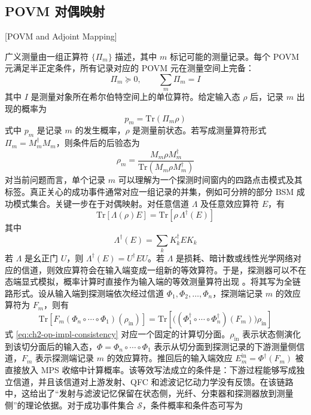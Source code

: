 \subsection{POVM 对偶映射}[POVM and Adjoint Mapping]

广义测量由一组正算符 $\{\Pi_m\}$ 描述，其中 $m$ 标记可能的测量记录。每个 POVM 元满足半正定条件，所有记录对应的 POVM 元在测量空间上完备：
\begin{equation}
\Pi_m \succeq 0,\qquad \sum_m \Pi_m = I
\label{eq:ch2-povm-complete}
\end{equation}
其中 $I$ 是测量对象所在希尔伯特空间上的单位算符。给定输入态 $\rho$ 后，记录 $m$ 出现的概率为
\begin{equation}
p_m=\mathrm{Tr}(\Pi_m\rho)
\label{eq:ch2-povm-prob}
\end{equation}
式中 $p_m$ 是记录 $m$ 的发生概率，$\rho$ 是测量前状态。若写成测量算符形式 $\Pi_m=M_m^{\dagger}M_m$，则条件后的后验态为
\begin{equation}
\rho_m=\frac{M_m\rho M_m^{\dagger}}{\mathrm{Tr}(M_m\rho M_m^{\dagger})}
\label{eq:ch2-posterior-single}
\end{equation}
对当前问题而言，单个记录 $m$ 可以理解为一个探测时间窗内的四路点击模式及其标签。真正关心的成功事件通常对应一组记录的并集，例如可分辨的部分 BSM 成功模式集合。关键一步在于对偶映射。对任意信道 $\Lambda$ 及任意效应算符 $E$，有
\begin{equation}
\mathrm{Tr}[\Lambda(\rho)E]
=
\mathrm{Tr}[\rho\,\Lambda^{\dagger}(E)]
\label{eq:ch2-adjoint}
\end{equation}
其中
\begin{equation}
\Lambda^{\dagger}(E)=\sum_k K_k^{\dagger}EK_k
\label{eq:ch2-adjoint-kraus}
\end{equation}
若 $\Lambda$ 是幺正门 $U$，则 $\Lambda^{\dagger}(E)=U^{\dagger}EU$。若 $\Lambda$ 是损耗、暗计数或线性光学网络对应的信道，则效应算符会在输入端变成一组新的等效算符。于是，探测器可以不在态端显式模拟，概率计算时直接作为输入端的等效测量算符出现 \cite{Kraus1983StatesEffectsOperations,NielsenChuang2010QCQI}。将其写为全链路形式。设从输入端到探测端依次经过信道 $\Phi_1,\Phi_2,\ldots,\Phi_n$，探测端记录 $m$ 的效应算符为 $F_m$，则有
\begin{equation}
\mathrm{Tr}\!\left[F_m(\Phi_n\circ\cdots\circ\Phi_1)(\rho_{\mathrm{in}})\right]
=
\mathrm{Tr}\!\left[\bigl((\Phi_1^{\dagger}\circ\cdots\circ\Phi_n^{\dagger})(F_m)\bigr)\rho_{\mathrm{in}}\right]
\label{eq:ch2-op-impl-consistency}
\end{equation}
式 \eqref{eq:ch2-op-impl-consistency} 对应一个固定的计算切分面。$\rho_{\mathrm{in}}$ 表示状态侧演化到该切分面后的输入态，$\Phi=\Phi_n\circ\cdots\circ\Phi_1$ 表示从切分面到探测记录的下游测量侧信道，$F_m$ 表示探测端记录 $m$ 的效应算符。推回后的输入端效应 $E_m^{\mathrm{in}}=\Phi^{\dagger}(F_m)$ 被直接放入 MPS 收缩中计算概率。该等效写法成立的条件是：下游过程能够写成独立信道，并且该信道对上游发射、QFC 和滤波记忆动力学没有反馈。在该链路中，这给出了“发射与滤波记忆保留在状态侧，光纤、分束器和探测器放到测量侧”的理论依据。对于成功事件集合 $\mathcal S$，条件概率和条件态可写为
